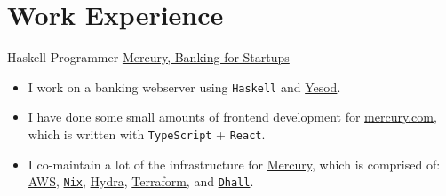\documentclass[10pt,letterpaper,sans]{moderncv}
\newcommand{\wlink}[2]{\textcolor[HTML]{461645}{\href{#1}{#2}}}
\newcommand{\lang}[1]{\texttt{#1}}
\begin{document}
\makecvtitle{}


\section{Work Experience}
  {Haskell Programmer}
  {\wlink{https://mercury.com}{Mercury, Banking for Startups}}
  {}
  {}
  {
\begin{itemize}
  \item I work on a banking webserver using \lang{Haskell} and \wlink{https://www.yesodweb.com/}{Yesod}.
  \item I have done some small amounts of frontend development for \wlink{https://mercury.com}{mercury.com}, which is written with \lang{TypeScript} + \lang{React}.
  \item I co-maintain a lot of the infrastructure for \textcolor{blue}{\wlink{https://mercury.com}{Mercury}}, which is comprised of: \wlink{https://aws.amazon.com/}{AWS}, \wlink{https://nixos.org/}{\lang{Nix}}, \wlink{https://nixos.wiki/wiki/Hydra}{Hydra}, \wlink{https://www.terraform.io/}{Terraform}, and \wlink{https://dhall-lang.org/}{\lang{Dhall}}.
\end{itemize}
}
\end{document}
